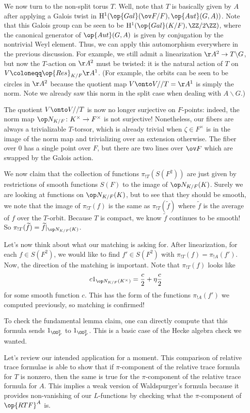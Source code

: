 \documentclass[../notes.tex]{subfiles}
\begin{document}
We now turn to the non-split torus $T$. Well, note that $T$ is basically given by $A$ after applying a Galois twist in $\mathrm H^1(\op{Gal}(\ov F/F),\op{Aut}(G,A))$. Note that this Galois group can be seen to be $\mathrm H^1(\op{Gal}(K/F),\ZZ/2\ZZ)$, where the canonical generator of $\op{Aut}(G,A)$ is given by conjugation by the nontrivial Weyl element. Thus, we can apply this automorphism everywhere in the previous discussion. For example, we still admit a linearization $\AA^2\to T\backslash G$, but now the $T$-action on $\AA^2$ must be twisted: it is the natural action of $T$ on $V\coloneqq\op{Res}_{K/F}\AA^1$. (For example, the orbits can be seen to be circles in $\AA^2$ because the quotient map $V\onto V//T=\AA^1$ is simply the norm. Note we already saw this norm in the split case when dealing with $A\backslash G$.)
\begin{remark}
	The quotient $V\onto V//T$ is now no longer surjective on $F$-points: indeed, the norm map $\op N_{K/F}\colon K^\times\to F^\times$ is not surjective! Nonetheless, our fibers are always a trivializable $T$-torsor, which is already trivial when $\zeta\in F^\times$ is in the image of the norm map and trivializing over an extension otherwise. The fiber over $0$ has a single point over $F$, but there are two lines over $\ov F$ which are swapped by the Galois action.
\end{remark}
We now claim that the collection of functions $\pi_{!T}(S(F^2))$ are just given by restrictions of smooth functions $S(F)$ to the image of $\op N_{K/F}(K)$. Surely we are looking at functions on $\op N_{K/F}(K)$, but to see that they should be smooth, we note that the image of $\pi_{!T}(f)$ is the same as $\pi_{!T}(\widetilde f)$ where $\widetilde f$ is the average of $f$ over the $T$-orbit. Because $T$ is compact, we know $\widetilde f$ continues to be smooth! So $\pi_{!T}(\widetilde f)=\widetilde f|_{\op N_{K/F}(K)}$.

Let's now think about what our matching is asking for. After linearization, for each $f\in S(F^2)$, we would like to find $f'\in S(F^2)$ with $\pi_{!T}(f)=\pi_{!A}(f')$. Now, the direction of the matching is important. Note that $\pi_{!T}(f)$ looks like
\[c1_{\op N_{K/F}(K^\times)}=\frac c2+\eta\frac c2\]
for some smooth function $c$. This has the form of the functions $\pi_{!A}(f')$ we computed previously, so matching is confirmed!
\begin{remark}
	To check the fundamental lemma claim, one can directly compute that this formula sends $1_{\OO_F^2}$ to $1_{\OO_F^2}$. This is a basic case of the Hecke algebra check we wanted.
\end{remark}
Let's review our intended application for a moment. This comparison of relative trace formulae is able to show that if $\pi$-component of the relative trace formula for $T$ is nonzero, then the same is true for the $\pi$-component of the relative trace formula for $A$. This implies a weak version of Waldspurger's formula because it provides non-vanishing of our $L$-functions by checking what the $\pi$-component of $\op{RTF}^A$ is.
\end{document}
